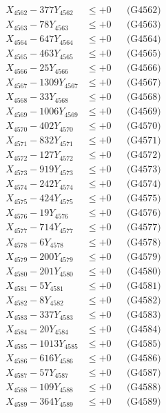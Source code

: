 \documentclass[a4paper,10pt]{article}
\begin{document}
{\begin{align}
X_{4562} - 377Y_{4562} &\leq +0 && \text{(G4562)} \\
X_{4563} - 78Y_{4563} &\leq +0 && \text{(G4563)} \\
X_{4564} - 647Y_{4564} &\leq +0 && \text{(G4564)} \\
X_{4565} - 463Y_{4565} &\leq +0 && \text{(G4565)} \\
X_{4566} - 25Y_{4566} &\leq +0 && \text{(G4566)} \\
X_{4567} - 1309Y_{4567} &\leq +0 && \text{(G4567)} \\
X_{4568} - 33Y_{4568} &\leq +0 && \text{(G4568)} \\
X_{4569} - 1006Y_{4569} &\leq +0 && \text{(G4569)} \\
X_{4570} - 402Y_{4570} &\leq +0 && \text{(G4570)} \\
\allowbreak
X_{4571} - 832Y_{4571} &\leq +0 && \text{(G4571)} \\
X_{4572} - 127Y_{4572} &\leq +0 && \text{(G4572)} \\
X_{4573} - 919Y_{4573} &\leq +0 && \text{(G4573)} \\
X_{4574} - 242Y_{4574} &\leq +0 && \text{(G4574)} \\
X_{4575} - 424Y_{4575} &\leq +0 && \text{(G4575)} \\
X_{4576} - 19Y_{4576} &\leq +0 && \text{(G4576)} \\
X_{4577} - 714Y_{4577} &\leq +0 && \text{(G4577)} \\
X_{4578} - 6Y_{4578} &\leq +0 && \text{(G4578)} \\
X_{4579} - 200Y_{4579} &\leq +0 && \text{(G4579)} \\
X_{4580} - 201Y_{4580} &\leq +0 && \text{(G4580)} \\
\allowbreak
X_{4581} - 5Y_{4581} &\leq +0 && \text{(G4581)} \\
X_{4582} - 8Y_{4582} &\leq +0 && \text{(G4582)} \\
X_{4583} - 337Y_{4583} &\leq +0 && \text{(G4583)} \\
X_{4584} - 20Y_{4584} &\leq +0 && \text{(G4584)} \\
X_{4585} - 1013Y_{4585} &\leq +0 && \text{(G4585)} \\
X_{4586} - 616Y_{4586} &\leq +0 && \text{(G4586)} \\
X_{4587} - 57Y_{4587} &\leq +0 && \text{(G4587)} \\
X_{4588} - 109Y_{4588} &\leq +0 && \text{(G4588)} \\
X_{4589} - 364Y_{4589} &\leq +0 && \text{(G4589)} \\

\end{align}}
\end{document}
